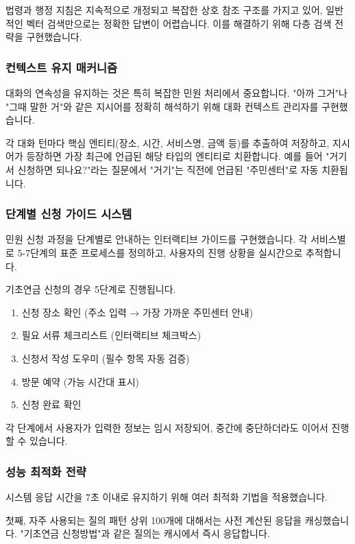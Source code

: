 법령과 행정 지침은 지속적으로 개정되고 복잡한 상호 참조 구조를 가지고 있어, 일반적인 벡터 검색만으로는 정확한 답변이 어렵습니다. 이를 해결하기 위해 다층 검색 전략을 구현했습니다.


\subsubsection{컨텍스트 유지 매커니즘}

대화의 연속성을 유지하는 것은 특히 복잡한 민원 처리에서 중요합니다. "아까 그거"나 "그때 말한 거"와 같은 지시어를 정확히 해석하기 위해 대화 컨텍스트 관리자를 구현했습니다.

각 대화 턴마다 핵심 엔티티(장소, 시간, 서비스명, 금액 등)를 추출하여 저장하고, 지시어가 등장하면 가장 최근에 언급된 해당 타입의 엔티티로 치환합니다. 예를 들어 "거기서 신청하면 되나요?"라는 질문에서 "거기"는 직전에 언급된 "주민센터"로 자동 치환됩니다.

\subsubsection{단계별 신청 가이드 시스템}

민원 신청 과정을 단계별로 안내하는 인터랙티브 가이드를 구현했습니다. 각 서비스별로 5-7단계의 표준 프로세스를 정의하고, 사용자의 진행 상황을 실시간으로 추적합니다.

기초연금 신청의 경우 5단계로 진행됩니다.
\begin{enumerate}
    \item 신청 장소 확인 (주소 입력 → 가장 가까운 주민센터 안내)
    \item 필요 서류 체크리스트 (인터랙티브 체크박스)
    \item 신청서 작성 도우미 (필수 항목 자동 검증)
    \item 방문 예약 (가능 시간대 표시)
    \item 신청 완료 확인
\end{enumerate}
각 단계에서 사용자가 입력한 정보는 임시 저장되어, 중간에 중단하더라도 이어서 진행할 수 있습니다.

\subsubsection{성능 최적화 전략}

시스템 응답 시간을 7초 이내로 유지하기 위해 여러 최적화 기법을 적용했습니다.

첫째, 자주 사용되는 질의 패턴 상위 100개에 대해서는 사전 계산된 응답을 캐싱했습니다. "기초연금 신청방법"과 같은 질의는 캐시에서 즉시 응답합니다.

